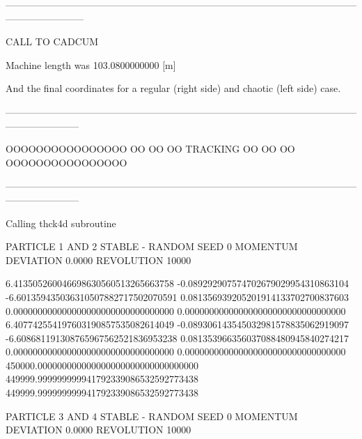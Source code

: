 \begin{ctverbatim}
 
------------------------------------------------------------------------------------------------------------------------------------
 
  CALL TO CADCUM
 
 Machine length was    103.0800000000 [m]
\end{ctverbatim}

\clearpage

And the final coordinates for a regular (right side) and chaotic (left side) case.

\begin{ctverbatim}
-----------------------------------------------------------------------------------------------------------------------------------

         OOOOOOOOOOOOOOOO
         OO            OO
         OO  TRACKING  OO
         OO            OO
         OOOOOOOOOOOOOOOO

-----------------------------------------------------------------------------------------------------------------------------------


 
 Calling thck4d subroutine
 

     PARTICLE       1 AND       2 STABLE - RANDOM SEED        0 MOMENTUM DEVIATION   0.0000    
     REVOLUTION    10000

                      6.413505260046698630560513265663758
                     -0.089292907574702679029954310863104
                     -6.601359435036310507882717502070591
                      0.081356939205201914133702700837603
                      0.000000000000000000000000000000000
                      0.000000000000000000000000000000000
                      6.407742554197603190857535082614049
                     -0.089306143545032981578835062919097
                     -6.608681191308765967562521836953238
                      0.081353966356037088480945840274217
                      0.000000000000000000000000000000000
                      0.000000000000000000000000000000000
                 450000.000000000000000000000000000000000
                 449999.999999999941792339086532592773438
                 449999.999999999941792339086532592773438

     PARTICLE       3 AND       4 STABLE - RANDOM SEED        0 MOMENTUM DEVIATION   0.0000    
     REVOLUTION    10000


\end{ctverbatim}
